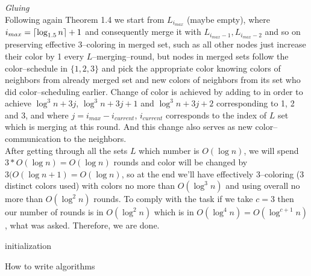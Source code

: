 \documentclass[]{article}
\DeclarePairedDelimiter\ceil{\lceil}{\rceil}
\begin{document}
\begin{enumerate}
	  \textit{Gluing}\\
	  Following again Theorem 1.4 we start from $L_{i_{max}}$ (maybe empty), where $i_{max} = \ceil{\log_{1.5}n} + 1$ and consequently merge it with $L_{i_{max}-1}, L_{i_{max}-2}$ and so on preserving effective 3--coloring in merged set, such as all other nodes just increase their color by 1 every $L$--merging--round, but nodes in merged sets follow the color--schedule in  $\{1, 2, 3\}$ and pick the appropriate color knowing colors of neighbors from already merged set and new colors of neighbors from its set who did color--scheduling earlier. Change of color is achieved by adding to in order to achieve $\log^3 n + 3j$, $\log^3 n + 3j + 1$ and $\log^3 n + 3j + 2$  corresponding to 1, 2 and 3, and where $j = i_{max} - i_{current}$, $i_{current}$ corresponds to the index of $L$ set which is merging at this round. And this change also serves as new color--communication to the neighbors.\\
	  After getting through all the sets $L$ which number is $O(\log n)$, we will spend $3*O(\log n)=O(\log n)$ rounds and color will be changed by $3(O(\log n + 1) = O(\log n)$, so at the end we'll have effectively 3--coloring (3 distinct colors used) with colors no more than $O(\log^3 n)$ and using overall no more than $O(\log^2 n)$ rounds. To comply with the task if we take $c = 3$ then our number of rounds is in $O(\log^2 n)$ which is in $ O(\log^4 n) = O(\log^{c+1} n)$, what was asked. Therefore, we are done.
	\begin{algorithm}[H]
		\SetAlgoLined
		initialization\;
		\caption{How to write algorithms}
	\end{algorithm}
	\fi
\end{enumerate}


\end{document}
